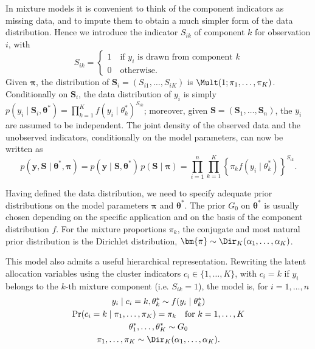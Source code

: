 In mixture models it is convenient to think of the component indicators as missing data, and to impute them to obtain a much simpler form of the data distribution. Hence we introduce the indicator $S_{ik}$ of component $k$ for observation $i$, with 
\begin{equation*}
S_{ik} = \begin{cases}
1 \quad \text{if $y_i$ is drawn from component $k$}\\
0 \quad \text{otherwise}.
\end{cases}
\end{equation*}
Given $\bm{\pi}$, the distribution of $\bm{S}_i = (S_{i1},\dots,S_{iK})$ is $\Mult(1;\pi_1,\dots,\pi_K)$. 
Conditionally on $\bm{S}_{i}$, the data distribution of $y_i$ is simply $p(y_i\mid \bm{S}_i,\bm{\theta}^*) = \prod_{k=1}^K f(y_i\mid\theta_k^*)^{S_{ik}}$; moreover, given $\bm{S}=(\bm{S}_1,\dots,\bm{S}_n)$, the $y_i$ are assumed to be independent.
The joint density of the observed data and the unobserved indicators, conditionally on the model parameters, can now be written as 
\begin{equation*}
p(\bm{y},\bm{S}\mid \bm{\theta}^*,\bm{\pi}) = p(\bm{y}\mid\bm{S},\bm{\theta}^*)\, p(\bm{S}\mid\bm{\pi}) = 
\prod_{i=1}^n \prod_{k=1}^K \left\{ \pi_k f(y_i\mid\theta_k^*) \right\}^{S_{ik}}.
\end{equation*}

Having defined the data distribution, we need to specify adequate prior distributions on the model parameters $\bm{\pi}$ and $\bm{\theta}^*$. The prior $G_0$ on $\bm{\theta}^*$ is usually chosen depending on the specific application and on the basis of the component distribution $f$. For the mixture proportions $\pi_k$, the conjugate and most natural prior distribution is the Dirichlet distribution, $\bm{\pi}\sim \Dir_K(\alpha_1,\dots,\alpha_K)$.

This model also admits a useful hierarchical representation. Rewriting the latent allocation variables using the cluster indicators $c_i\in\{1,\dots,K\}$, with $c_i=k$ if $y_i$ belongs to the $k$-th mixture component (i.e. $S_{ik} = 1$), the model is, for $i = 1,\dots,n$ 
\begin{equation}
\begin{gathered}
y_i \mid c_i = k, \theta^*_k \sim f(y_i\mid\theta^*_k)\\
\Pr(c_i = k \mid \pi_1,\dots,\pi_K) = \pi_k \quad \text{for } k = 1,\dots,K\\ 
\theta^*_1,\dots,\theta^*_K \sim G_0\\
\pi_1,\dots,\pi_K  \sim \Dir_K(\alpha_1,\dots,\alpha_K).
\end{gathered}
\label{ch1_eq:finitemix_h1}
\end{equation}

